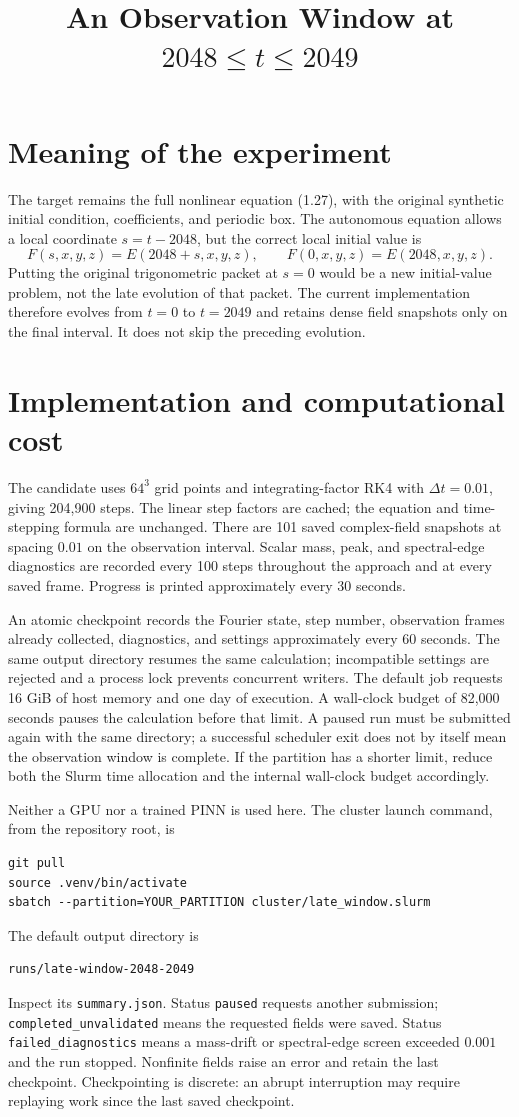 \documentclass[11pt]{article}
\title{An Observation Window at $2048\leq t\leq2049$}
\author{}\date{}
\begin{document}
\maketitle
\section{Meaning of the experiment}
The target remains the full nonlinear equation (1.27), with the original synthetic initial condition, coefficients, and periodic box. The autonomous equation allows a local coordinate $s=t-2048$, but the correct local initial value is
\[
F(s,x,y,z)=E(2048+s,x,y,z),\qquad F(0,x,y,z)=E(2048,x,y,z).
\]
Putting the original trigonometric packet at $s=0$ would be a new initial-value problem, not the late evolution of that packet. The current implementation therefore evolves from $t=0$ to $t=2049$ and retains dense field snapshots only on the final interval. It does not skip the preceding evolution.
\section{Implementation and computational cost}
The candidate uses $64^3$ grid points and integrating-factor RK4 with $\Delta t=0.01$, giving 204,900 steps. The linear step factors are cached; the equation and time-stepping formula are unchanged. There are 101 saved complex-field snapshots at spacing $0.01$ on the observation interval. Scalar mass, peak, and spectral-edge diagnostics are recorded every 100 steps throughout the approach and at every saved frame. Progress is printed approximately every 30 seconds.

An atomic checkpoint records the Fourier state, step number, observation frames already collected, diagnostics, and settings approximately every 60 seconds. The same output directory resumes the same calculation; incompatible settings are rejected and a process lock prevents concurrent writers. The default job requests 16 GiB of host memory and one day of execution. A wall-clock budget of 82,000 seconds pauses the calculation before that limit. A paused run must be submitted again with the same directory; a successful scheduler exit does not by itself mean the observation window is complete. If the partition has a shorter limit, reduce both the Slurm time allocation and the internal wall-clock budget accordingly.

Neither a GPU nor a trained PINN is used here. The cluster launch command, from the repository root, is
\begin{verbatim}
git pull
source .venv/bin/activate
sbatch --partition=YOUR_PARTITION cluster/late_window.slurm
\end{verbatim}
The default output directory is
\begin{verbatim}
runs/late-window-2048-2049
\end{verbatim}
Inspect its \texttt{summary.json}. Status \texttt{paused} requests another submission; \texttt{completed\_unvalidated} means the requested fields were saved. Status \texttt{failed\_diagnostics} means a mass-drift or spectral-edge screen exceeded $0.001$ and the run stopped. Nonfinite fields raise an error and retain the last checkpoint. Checkpointing is discrete: an abrupt interruption may require replaying work since the last saved checkpoint.
\end{document}

